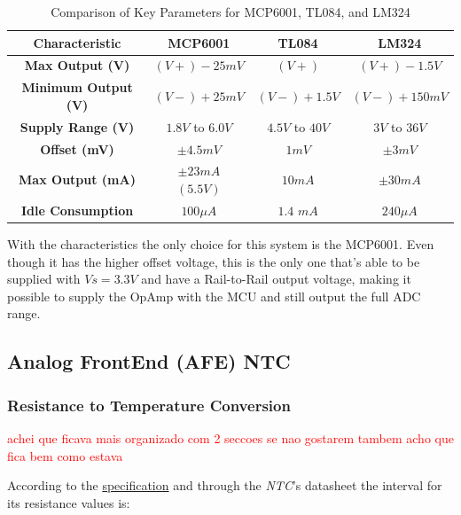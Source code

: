 \documentclass[12pt]{article}
\begin{document}
    \begin{table}[h]
        \centering
        \begin{tabular}{|c|c|c|c|}
        \hline
        \textbf{Characteristic}         & \textbf{MCP6001}      & \textbf{TL084}   & \textbf{LM324}  \\ \hline
        \textbf{Max Output (V)}         &$(V+)-25mV$            & $(V+)$           & $(V+) - 1.5V$   \\ \hline
        \textbf{Minimum Output (V)}     &$(V-)+25mV$            & $(V-) + 1.5V$   & $(V-) + 150mV$  \\ \hline
        \textbf{Supply Range (V)}       & $1.8V$ to $6.0V$      & $4.5V$ to $40V$  & $3V$ to $36V$   \\ \hline
        \textbf{Offset (mV)}            & $\pm 4.5mV$             & $1mV$              & $\pm 3 mV$      \\ \hline
        \textbf{Max Output (mA)}        & $\pm 23 mA$ $(5.5V)$  & $10 mA$          & $\pm 30 mA$     \\ \hline
        \textbf{Idle Consumption}       & $100 \mu A $          & $1.4$ $mA$       & $240 \mu A$      \\ \hline
        \end{tabular}
        \caption{Comparison of Key Parameters for MCP6001, TL084, and LM324}
    \end{table}

    With the characteristics the only choice for this system is the MCP6001. Even though it has the higher offset voltage, this is the only one that's able to be supplied with $Vs=3.3V$ and have a Rail-to-Rail output voltage, making it possible to supply the OpAmp with the MCU and still output the full ADC range.


\subsection{Analog FrontEnd (AFE) NTC}
\label{AFENTC}

    \subsubsection{ Resistance to Temperature Conversion }

    \textcolor{red}{ achei que ficava mais organizado com 2 seccoes se nao gostarem tambem acho que fica bem como estava }

    According to the \hyperref[requirements]{specification} and through the \textit{NTC}'s datasheet the interval for its resistance values is:
    
\end{document}
